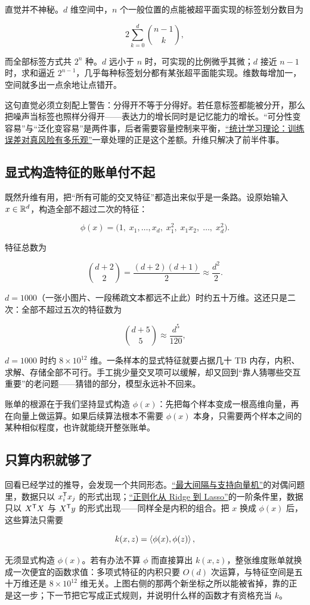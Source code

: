 直觉并不神秘。\(d\) 维空间中，\(n\) 个一般位置的点能被超平面实现的标签划分数目为

\[
2\sum_{k=0}^{d}\binom{n-1}{k},
\]

而全部标签方式共 \(2^n\) 种。\(d\) 远小于 \(n\) 时，可实现的比例微乎其微；\(d\) 接近 \(n-1\) 时，求和逼近 \(2^{n-1}\)，几乎每种标签划分都有某张超平面能实现。维数每增加一，空间就多出一点余地让点错开。

这句直觉必须立刻配上警告：分得开不等于分得好。若任意标签都能被分开，那么把噪声当标签也照样分得开——表达力的增长同时是记忆能力的增长。``可分性变容易''与``泛化变容易''是两件事，后者需要容量控制来平衡，\hyperref[ch:118]{``统计学习理论：训练误差对真风险有多乐观''}一章处理的正是这个差额。升维只解决了前半件事。

\subsection{显式构造特征的账单付不起}

既然升维有用，把``所有可能的交叉特征''都造出来似乎是一条路。设原始输入 \(x\in\mathbb{R}^d\)，构造全部不超过二次的特征：

\[
\phi(x)=\bigl(1,\;x_1,\dots,x_d,\;x_1^2,\;x_1x_2,\;\dots,\;x_d^2\bigr).
\]

特征总数为

\[
\binom{d+2}{2}=\frac{(d+2)(d+1)}{2}\approx \frac{d^2}{2}.
\]

\(d=1000\)（一张小图片、一段稀疏文本都远不止此）时约五十万维。这还只是二次：全部不超过五次的特征数为

\[
\binom{d+5}{5}\approx \frac{d^5}{120},
\]

\(d=1000\) 时约 \(8\times 10^{12}\) 维。一条样本的显式特征就要占据几十 TB 内存，内积、求解、存储全部不可行。手工挑少量交叉项可以缓解，却又回到``靠人猜哪些交互重要''的老问题——猜错的部分，模型永远补不回来。

账单的根源在于我们坚持显式构造 \(\phi(x)\)：先把每个样本变成一根高维向量，再在向量上做运算。如果后续算法根本不需要 \(\phi(x)\) 本身，只需要两个样本之间的某种相似程度，也许就能绕开整张账单。

\subsection{只算内积就够了}

回看已经学过的推导，会发现一个共同形态。\hyperref[sec:09-Convex-Optimization/07-Applications/03]{``最大间隔与支持向量机''}的对偶问题里，数据只以 \(x_i^{\mathsf{T}}x_j\) 的形式出现；\hyperref[sec:13-Machine-Learning/02-Linear-Models/02]{``正则化从 Ridge 到 Lasso''}的一阶条件里，数据只以 \(X^{\mathsf{T}}X\) 与 \(X^{\mathsf{T}}y\) 的形式出现——同样全是内积的组合。把 \(x\) 换成 \(\phi(x)\) 后，这些算法只需要

\[
k(x,z)=\left\langle\phi(x),\phi(z)\right\rangle,
\]

无须显式构造 \(\phi(x)\)。若有办法不算 \(\phi\) 而直接算出 \(k(x,z)\)，整张维度账单就换成一次便宜的函数求值：多项式特征的内积只要 \(O(d)\) 次运算，与特征空间是五十万维还是 \(8\times10^{12}\) 维无关。上图右侧的那两个新坐标之所以能被省掉，靠的正是这一步；下一节把它写成正式规则，并说明什么样的函数才有资格充当 \(k\)。
